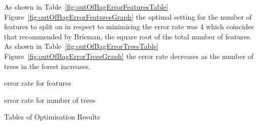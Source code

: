 		As shown in Table~\ref{fig:outOfBagErrorFeaturesTable} Figure~\ref{fig:outOfBagErrorFeaturesGraph} the optimal setting for the  number of features to split on in respect to minimising the error rate was 4 which coincides that recommended by Brieman, the square root of the total number of features.\\
		
		As shown in Table~\ref{fig:outOfBagErrorTreesTable} Figure~\ref{fig:outOfBagErrorTreesGraph} the error rate decreases as the number of trees in the forest increases.

	\begin{table}[H]
		\centering
		\begin{subtable}{.45\linewidth}\centering
			\hfill
			\caption{error rate for features}
			\label{fig:outOfBagErrorFeaturesTable}
    		\end{subtable}
    		\hfill
		\begin{subtable}{.45\linewidth}\centering
			\caption{error rate for number of trees}
			\label{fig:outOfBagErrorTreesTable}
    		\end{subtable}
    		\caption{Tables of Optimisation Results}
    		\label{fig:optimisationResultsTables}	
    	\end{table}
		
